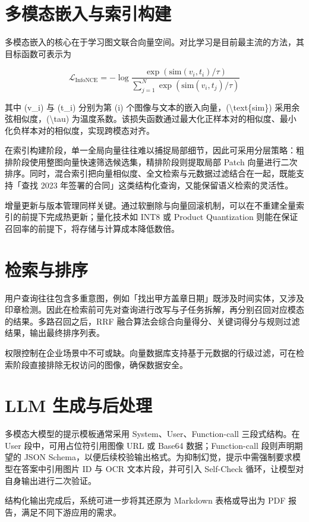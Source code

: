 \chapter{多模态嵌入与索引构建}
多模态嵌入的核心在于学习图文联合向量空间。对比学习是目前最主流的方法，其目标函数可表示为\par
$$ \mathcal{L}_{\text{InfoNCE}}=-\log\frac{\exp(\text{sim}(v_i,t_i)/\tau)}{\sum_{j=1}^{N}\exp(\text{sim}(v_i,t_j)/\tau)} $$\par
其中 (v\_{}i) 与 (t\_{}i) 分别为第 (i) 个图像与文本的嵌入向量，(\textbackslash{}text\{{}sim\}{}) 采用余弦相似度，(\textbackslash{}tau) 为温度系数。该损失函数通过最大化正样本对的相似度、最小化负样本对的相似度，实现跨模态对齐。\par
在索引构建阶段，单一全局向量往往难以捕捉局部细节，因此可采用分层策略：粗排阶段使用整图向量快速筛选候选集，精排阶段则提取局部 Patch 向量进行二次排序。同时，混合索引把向量相似度、全文检索与元数据过滤结合在一起，既能支持「查找 2023 年签署的合同」这类结构化查询，又能保留语义检索的灵活性。\par
增量更新与版本管理同样关键。通过软删除与向量回滚机制，可以在不重建全量索引的前提下完成热更新；量化技术如 INT8 或 Product Quantization 则能在保证召回率的前提下，将存储与计算成本降低数倍。\par
\chapter{检索与排序}
用户查询往往包含多重意图，例如「找出甲方盖章日期」既涉及时间实体，又涉及印章检测。因此在检索前可先对查询进行改写与子任务拆解，再分别召回对应模态的结果。多路召回之后，RRF 融合算法会综合向量得分、关键词得分与规则过滤结果，输出最终排序列表。\par
权限控制在企业场景中不可或缺。向量数据库支持基于元数据的行级过滤，可在检索阶段直接排除无权访问的图像，确保数据安全。\par
\chapter{LLM 生成与后处理}
多模态大模型的提示模板通常采用 System、User、Function-call 三段式结构。在 User 段中，可用占位符引用图像 URL 或 Base64 数据；Function-call 段则声明期望的 JSON Schema，以便后续校验输出格式。为抑制幻觉，提示中需强制要求模型在答案中引用图片 ID 与 OCR 文本片段，并可引入 Self-Check 循环，让模型对自身输出进行二次验证。\par
结构化输出完成后，系统可进一步将其还原为 Markdown 表格或导出为 PDF 报告，满足不同下游应用的需求。\par
